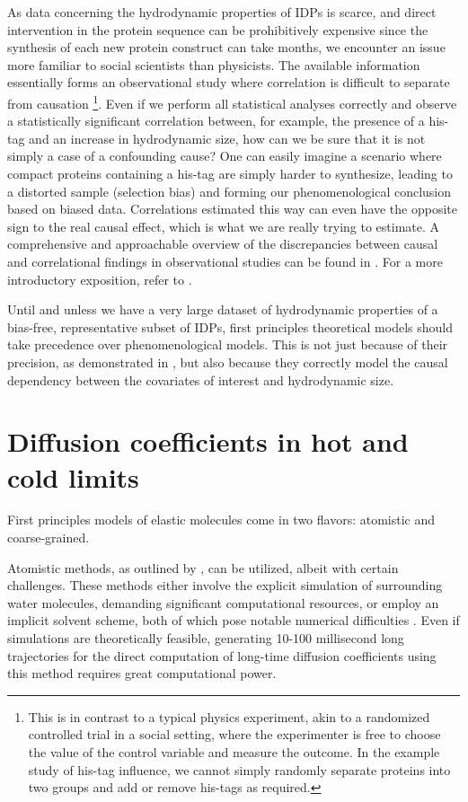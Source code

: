 \documentclass{doctoral}
\begin{document}
As data concerning the hydrodynamic properties of IDPs is scarce, and direct intervention in the protein sequence can be prohibitively expensive since the synthesis of each new protein construct can take months, we encounter an issue more familiar to social scientists than physicists.
The available information essentially forms an observational study where correlation is difficult to separate from causation \footnote{This is in contrast to a typical physics experiment, akin to a randomized controlled trial in a social setting, where the experimenter is free to choose the value of the control variable and measure the outcome.
    In the example study of his-tag influence, we cannot simply randomly separate proteins into two groups and add or remove his-tags as required.
}.
Even if we perform all statistical analyses correctly and observe a statistically significant correlation between, for example, the presence of a his-tag and an increase in hydrodynamic size, how can we be sure that it is not simply a case of a confounding cause?
One can easily imagine a scenario where compact proteins containing a his-tag are simply harder to synthesize, leading to a distorted sample (selection bias) and forming our phenomenological conclusion based on biased data.
Correlations estimated this way can even have the opposite sign to the real causal effect, which is what we are really trying to estimate.
A comprehensive and approachable overview of the discrepancies between causal and correlational findings in observational studies can be found in \textcite{Cinelli_2022}.
For a more introductory exposition, refer to \textcite{Neal_2020}.

Until and unless we have a very large dataset of hydrodynamic properties of a bias-free, representative subset of IDPs, first principles theoretical models should take precedence over phenomenological models.
This is not just because of their precision, as demonstrated in \textcite{Waszkiewicz_2024_mda}, but also because they correctly model the causal dependency between the covariates of interest and hydrodynamic size.

\section{Diffusion coefficients in hot and cold limits}

First principles models of elastic molecules come in two flavors: atomistic and coarse-grained.

Atomistic methods, as outlined by \textcite{Karplus_1990}, can be utilized, albeit with certain challenges.
These methods either involve the explicit simulation of surrounding water molecules, demanding significant computational resources, or employ an implicit solvent scheme, both of which pose notable numerical difficulties \cite{Frenkel_2001}.
Even if simulations are theoretically feasible, generating 10-100 millisecond long trajectories for the direct computation of long-time diffusion coefficients using this method requires great computational power.
\end{document}
